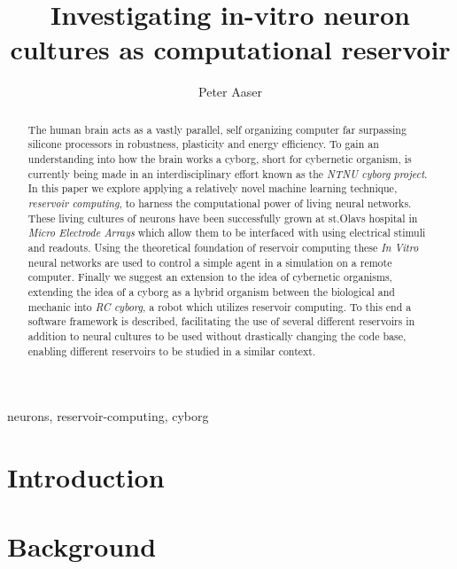 \documentclass[journal]{IEEEtran}
\begin{document}
\title{Investigating in-vitro neuron cultures as computational reservoir}

\author{Peter Aaser}
%
\maketitle

\begin{abstract}
  The human brain acts as a vastly parallel, self organizing computer far
  surpassing silicone processors in robustness, plasticity and energy
  efficiency.
  To gain an understanding into how the brain works a cyborg, short for
  cybernetic organism, is currently being made in an interdisciplinary effort
  known as the \textit{NTNU cyborg project}.
  In this paper we explore applying a relatively novel machine learning
  technique, \textit{reservoir computing}, to harness the computational power of
  living neural networks.
  These living cultures of neurons have been successfully grown at st.Olavs
  hospital in \textit{Micro Electrode Arrays} which allow them to be interfaced
  with using electrical stimuli and readouts.
  Using the theoretical foundation of reservoir computing these \textit{In
    Vitro} neural networks are used to control a simple agent in a simulation on
  a remote computer.
  Finally we suggest an extension to the idea of cybernetic organisms, extending
  the idea of a cyborg as a hybrid organism between the biological and mechanic
  into \textit{RC cyborg}, a robot which utilizes reservoir computing.
  To this end a software framework is described, facilitating the use of several
  different reservoirs in addition to neural cultures to be used without
  drastically changing the code base, enabling different reservoirs to be
  studied in a similar context.
\end{abstract}

\begin{IEEEkeywords}
neurons, reservoir-computing, cyborg
\end{IEEEkeywords}

\section{Introduction}

\section{Background}

\end{document}
